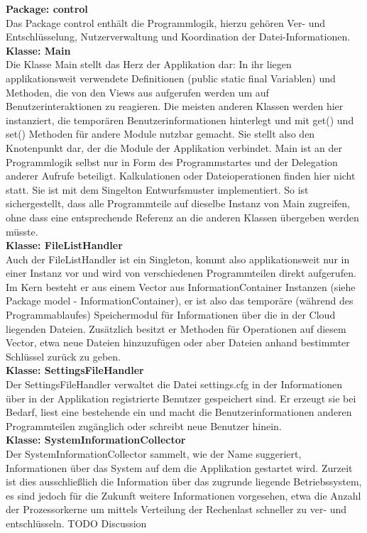 \documentclass[12pt,a4paper,bibliography=totocnumbered,listof=totocnumbered]{scrartcl}
\begin{document}
\textbf{Package: control}\\
Das Package control enthält die Programmlogik, hierzu gehören Ver- und Entschlüsselung, Nutzerverwaltung und Koordination der Datei-Informationen.\\
\textbf{Klasse: Main}\\
Die Klasse Main stellt das Herz der Applikation dar: In ihr liegen applikationsweit verwendete Definitionen (public static final Variablen) und Methoden, die von den Views aus aufgerufen werden um auf Benutzerinteraktionen zu reagieren. Die meisten anderen Klassen werden hier instanziert, die temporären Benutzerinformationen hinterlegt und mit get() und set() Methoden für andere Module nutzbar gemacht. Sie stellt also den Knotenpunkt dar, der die Module der Applikation verbindet. Main ist an der Programmlogik selbst nur in Form des Programmstartes und der Delegation anderer Aufrufe beteiligt. Kalkulationen oder Dateioperationen finden hier nicht statt. Sie ist mit dem Singelton Entwurfsmuster implementiert. So ist sichergestellt, dass alle Programmteile auf dieselbe Instanz von Main zugreifen, ohne dass eine entsprechende Referenz an die anderen Klassen übergeben werden müsste.\\
\textbf{Klasse: FileListHandler}\\
Auch der FileListHandler ist ein Singleton, kommt also applikationsweit nur in einer Instanz vor und wird von verschiedenen Programmteilen direkt aufgerufen. Im Kern besteht er aus einem Vector aus InformationContainer Instanzen (siehe Package model - InformationContainer), er ist also das temporäre (während des Programmablaufes) Speichermodul für Informationen über die in der Cloud liegenden Dateien. Zusätzlich besitzt er Methoden für Operationen auf diesem Vector, etwa neue Dateien hinzuzufügen oder aber Dateien anhand bestimmter Schlüssel zurück zu geben.\\
\textbf{Klasse: SettingsFileHandler}\\
Der SettingsFileHandler verwaltet die Datei settings.cfg in der Informationen über in der Applikation registrierte Benutzer gespeichert sind. Er erzeugt sie bei Bedarf, liest eine bestehende ein und macht die Benutzerinformationen anderen Programmteilen zugänglich oder schreibt neue Benutzer hinein.\\
\textbf{Klasse: SystemInformationCollector}\\
Der SystemInformationCollector sammelt, wie der Name suggeriert, Informationen über das System auf dem die Applikation gestartet wird. Zurzeit ist dies ausschließlich die Information über das zugrunde liegende Betriebssystem, es sind jedoch für die Zukunft weitere Informationen vorgesehen, etwa die Anzahl der Prozessorkerne um mittels Verteilung der Rechenlast schneller zu ver- und entschlüsseln. TODO Discussion\\
\end{document}
